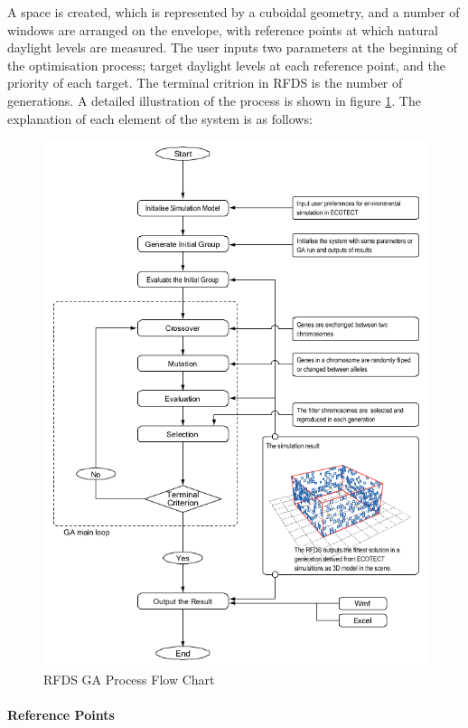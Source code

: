 A space is created, which is represented by a cuboidal geometry, and a number of windows are arranged on the envelope, with reference points at which natural daylight levels are measured. The user inputs two parameters at the beginning of the optimisation process; target daylight levels at each reference point, and the priority of each target. The terminal critrion in RFDS is the number of generations. A detailed illustration of the process is shown in figure \ref{kawakitaGA}. The explanation of each element of the system is as follows:

\begin{figure}[hbtp]
\centering
\includegraphics[width=\textwidth]{../Chapter3/Images/16-kawakitaGA}
\caption[RFDS GA Process Flow Chart]{RFDS GA Process Flow Chart \cite{kawakita08}}
\label{kawakitaGA}
\end{figure}


\paragraph{Reference Points}\mbox{}\\

